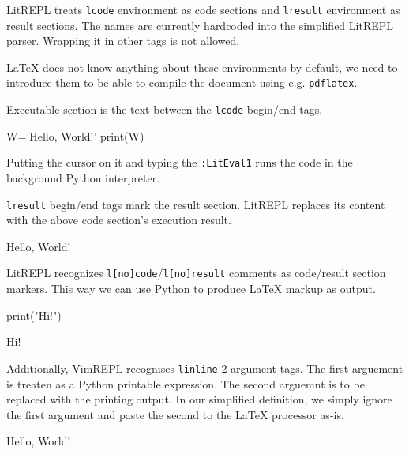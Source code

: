 \documentclass{article}
\begin{document}
LitREPL treats \texttt{lcode} environment as code sections and \texttt{lresult}
environment as result sections. The names are currently hardcoded into the
simplified LitREPL parser. Wrapping it in other tags is not allowed.

LaTeX does not know anything about these environments by default, we need to
introduce them to be able to compile the document using e.g. \texttt{pdflatex}.

\newenvironment{lcode}{\begin{texttt}}{\end{texttt}}
\newenvironment{lresult}{\begin{texttt}}{\end{texttt}}
\newcommand{\linline}[2]{#2}

Executable section is the text between the \texttt{lcode} begin/end tags.

\begin{lcode}
W='Hello, World!'
print(W)
\end{lcode}

Putting the cursor on it and typing the \texttt{:LitEval1} runs the code in the
background Python interpreter.

\texttt{lresult} begin/end tags mark the result section.  LitREPL replaces its
content with the above code section's execution result.

\begin{lresult}
Hello, World!
\end{lresult}

LitREPL recognizes \texttt{l[no]code}/\texttt{l[no]result} comments as
code/result section markers. This way we can use Python to produce LaTeX markup
as output.

print("Hi!")

Hi!

Additionally, VimREPL recognises \texttt{linline} 2-argument tags. The first
arguement is treaten as a Python printable expression. The second arguemnt is to
be replaced with the printing output. In our simplified definition, we simply
ignore the first argument and paste the second to the LaTeX processor as-is.

\linline{W}{Hello, World!}
\end{document}
